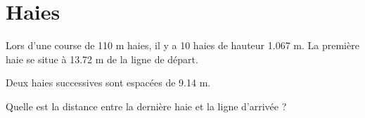 \section{Haies}

Lors d'une course de 110 m haies, il y a 10 haies de hauteur \num{1.067} m. La première haie se situe à \num{13.72} m de la ligne de départ.

Deux haies successives sont espacées de \num{9.14} m.

\begin{questions}
	\question Quelle est la distance entre la dernière haie et la ligne d'arrivée ?
\end{questions}
